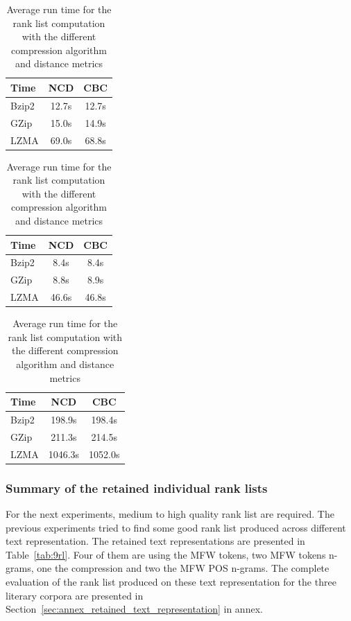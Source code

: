 \begin{table}
  \centering
  \caption{Average run time for the rank list computation with the different compression algorithm and distance metrics}
  \label{tab:compression_evaluation_times}

  \label{tab:compression_evaluation_time_oxquarry}
  \begin{tabular}{l c c}
    \toprule
    Time      & NCD   & CBC \\
    \midrule
    Bzip2     & 12.7s & 12.7s \\
    GZip      & 15.0s & 14.9s \\
    LZMA      & 69.0s & 68.8s \\
    \bottomrule
  \end{tabular}

  \vspace{0.5cm}

  \label{tab:compression_evaluation_time_brunet}
  \begin{tabular}{l c c}
    \toprule
    Time      & NCD   & CBC \\
    \midrule
    Bzip2     & 8.4s & 8.4s \\
    GZip      & 8.8s & 8.9s \\
    LZMA      & 46.6s & 46.8s \\
    \bottomrule
  \end{tabular}

  \vspace{0.5cm}

  \label{tab:compression_evaluation_time_st_jean}
  \begin{tabular}{l c c}
    \toprule
    Time      & NCD    & CBC \\
    \midrule
    Bzip2     & 198.9s  & 198.4s \\
    GZip      & 211.3s  & 214.5s \\
    LZMA      & 1046.3s & 1052.0s \\
    \bottomrule
  \end{tabular}
\end{table}

\subsubsection{Summary of the retained individual rank lists}

For the next experiments, medium to high quality rank list are required.
The previous experiments tried to find some good rank list produced across different text representation.
The retained text representations are presented in Table~\ref{tab:9rl}.
Four of them are using the MFW tokens, two MFW tokens n-grams, one the compression and two the MFW POS n-grams.
The complete evaluation of the rank list produced on these text representation for the three literary corpora are presented in Section~\ref{sec:annex_retained_text_representation} in annex.

